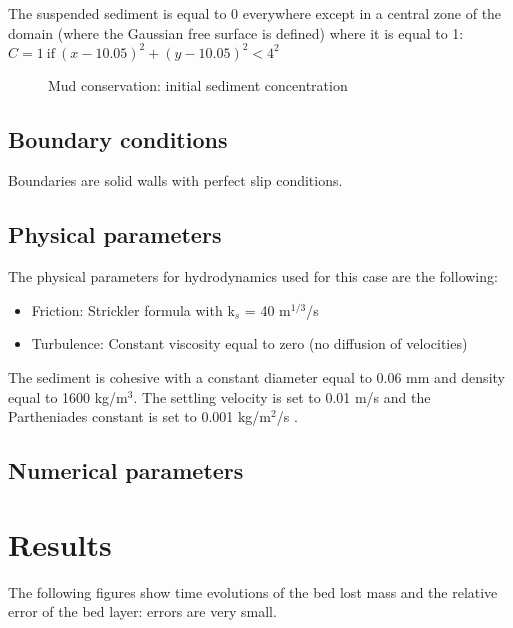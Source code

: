 The suspended sediment is equal to 0 everywhere except in a central zone of the domain (where the Gaussian free surface is defined)
 where it is equal to 1:
$C=1 ~\text{if}~ (x-10.05)^2+(y-10.05)^2<4^2$

\begin{figure}[H]
\begin{center}
\end{center}
\caption{Mud conservation: initial sediment concentration}
\label{fig:mudcons_init}
\end{figure}
%
\subsection{Boundary conditions}
%
Boundaries are solid walls with perfect slip conditions.
%

%
\subsection{Physical parameters}
%
The physical parameters for hydrodynamics used for this case are the following:
\begin{itemize}
\item Friction: Strickler formula with k$_s$ = 40 m$^{1/3}$/s
\item Turbulence: Constant viscosity equal to zero (no diffusion of velocities)
\end{itemize}
%
The sediment is cohesive with a constant diameter equal to 0.06 mm and density equal to 1600 kg/m$^3$. The settling velocity is set to 0.01 m/s and the Partheniades constant is set to 0.001 kg/m$^2$/s .
%
\subsection{Numerical parameters}

%
%
\section{Results}
The following figures show time evolutions of the bed lost mass and the relative error of the bed layer: errors are very small.


